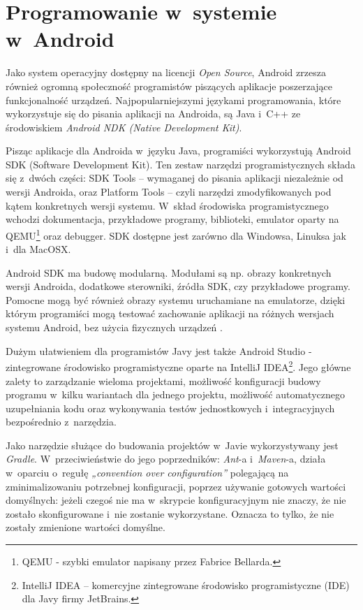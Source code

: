 \section{Programowanie w~systemie w~Android}
Jako system operacyjny dostępny na licencji \textit{Open Source}, Android zrzesza również ogromną społeczność programistów piszących aplikacje poszerzające funkcjonalność urządzeń. Najpopularniejszymi językami programowania, które wykorzystuje się do pisania aplikacji na Androida, są Java i~C++ ze środowiskiem \textit{Android NDK (Native Development Kit)}. 

Pisząc aplikacje dla Androida w~języku Java, programiści wykorzystują Android SDK (Software Development Kit). Ten zestaw narzędzi programistycznych składa się z~dwóch części: SDK Tools – wymaganej do pisania aplikacji niezależnie od wersji Androida, oraz Platform Tools – czyli narzędzi zmodyfikowanych pod kątem konkretnych wersji systemu. W~skład środowiska programistycznego wchodzi dokumentacja, przykładowe programy, biblioteki, emulator oparty na QEMU\footnote{QEMU - szybki emulator napisany przez Fabrice Bellarda.} oraz debugger. SDK dostępne jest zarówno dla Windowsa, Linuksa jak i~dla MacOSX.

Android SDK ma budowę modularną. Modułami są np. obrazy konkretnych wersji Androida, dodatkowe sterowniki, źródła SDK, czy przykładowe programy. Pomocne mogą być również obrazy systemu uruchamiane na emulatorze, dzięki którym programiści mogą  testować zachowanie aplikacji na różnych wersjach systemu Android, bez użycia fizycznych urządzeń \cite{website:wikipedia}.

Dużym ułatwieniem dla programistów Javy jest także Android Studio - zintegrowane środowisko programistyczne oparte na IntelliJ IDEA\footnote{IntelliJ IDEA – komercyjne zintegrowane środowisko programistyczne (IDE) dla Javy firmy JetBrains.}. Jego główne zalety to zarządzanie wieloma projektami, możliwość konfiguracji budowy programu w~kilku wariantach dla jednego projektu, możliwość automatycznego uzupełniania kodu oraz wykonywania testów jednostkowych i~integracyjnych bezpośrednio z~narzędzia.

Jako narzędzie służące do budowania projektów w~Javie wykorzystywany jest \textit{Gradle}. W~przeciwieństwie do jego poprzedników: \textit{Ant}-a i~\textit{Maven}-a, działa w~oparciu o~regułę \textit{„convention over configuration”} polegającą na zminimalizowaniu potrzebnej konfiguracji, poprzez używanie gotowych wartości domyślnych: jeżeli czegoś nie ma w~skrypcie konfiguracyjnym nie znaczy, że nie zostało skonfigurowane i~nie zostanie wykorzystane. Oznacza to tylko, że nie zostały zmienione wartości domyślne.

